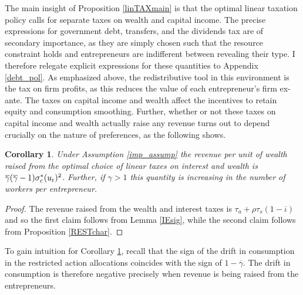 \documentclass[11pt]{article}
\theoremstyle{plain}
\newtheorem{corl}[thm]{Corollary}
\begin{document}
The main insight of Proposition \ref{linTAXmain} is that the optimal linear taxation policy calls for separate taxes on wealth and capital income. The precise expressions for government debt, transfers, and the dividends tax are of secondary importance, as they are simply chosen such that the resource constraint holds and entrepreneurs are indifferent between revealing their type. I therefore relegate explicit expressions for these quantities to Appendix \ref{debt_pol}. As emphasized above, the redistributive tool in this environment is the tax on firm profits, as this reduces the value of each entrepreneur's firm ex-ante. The taxes on capital income and wealth affect the incentives to retain equity and consumption smoothing. Further, whether or not these taxes on capital income and wealth actually raise any revenue turns out to depend crucially on the nature of preferences, as the following shows. 


\begin{corl}\label{colREVENUEmain}
Under Assumption \ref{imp_assump} the revenue per unit of wealth raised from the optimal choice of linear taxes on interest and wealth is $\overline{\gamma}(\overline{\gamma}-1) \sigma_c^*(u_{\textnormal{r}})^2$. Further, if $\gamma>1$ this quantity is increasing in the number of workers per entrepreneur. 
\end{corl}

\begin{proof}
The revenue raised from the wealth and interest taxes is $\tau_a + \rho \tau_s(1-\overline{\iota})$ and so the first claim follows from Lemma \ref{IEsig}, while the second claim follows from Proposition \ref{RESTchar}. 
\end{proof}

To gain intuition for Corollary \ref{colREVENUEmain}, recall that the sign of the drift in consumption in the restricted action allocations coincides with the sign of $1-\overline{\gamma}$. The drift in consumption is therefore negative precisely when revenue is being raised from the entrepreneurs. 
\end{document}

